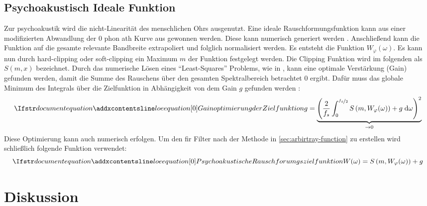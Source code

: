 \subsection{Psychoakustisch Ideale Funktion}

Zur psychoakustik wird die nicht-Linearität des menschlichen Ohrs ausgenutzt.
Eine ideale Rauschformungsfunktion kann aus einer modifizierten Abwandlung der $0$ \gls{phon} \gls{ath} Kurve aus  gewonnen werden.
Diese kann numerisch generiert werden \autocite[S. 2 ff.]{iso226}\autocite{iso226matlab}.
Anschließend kann die Funktion auf die gesamte relevante Bandbreite extrapoliert und folglich normalisiert werden.
Es entsteht die Funktion $W_\varphi(\omega)$.
Es kann nun durch \gls{hard-clipping} oder \gls{soft-clipping} ein Maximum $m$ der Funktion festgelegt werden.
Die Clipping Funktion wird im folgenden als $S(m, x)$ bezeichnet.
Durch das numerische Lösen eines \foreignquote{english}{Least-Squares} Problems, wie in \citeauthor{noise-shaping} \autocite{noise-shaping}, kann eine optimale Verstärkung (Gain) gefunden werden, damit die Summe des Rauschens über den gesamten Spektralbereich betrachtet 0 ergibt.
Dafür muss das globale Minimum des Integrals über die Zielfunktion in Abhängigkeit von dem Gain $g$ gefunden werden \autocite[S. 149]{noise-shaping}:
\begin{equation}
\setequationentry{Gainoptimierung der Zielfunktion}
g = \underbrace{\left( \frac{2}{f_s} \int_{0}^{\nicefrac{f_s}{2}} S \left(m , W_\varphi(\omega)\right) + g\; \text{d} \omega \right)^2}_{\to 0}
\label{eq:optimize}
\end{equation}
Diese Optimierung kann auch numerisch erfolgen.
Um den \gls{fir} Filter nach der Methode in \autoref{sec:arbirtray-function} zu erstellen wird schließlich folgende Funktion verwendet:
\begin{equation}
\setequationentry{Psychoakustische Rauschforumgszielfunktion}
W(\omega) = S \left( m, W_\varphi(\omega) \right) + g
\end{equation}

\section{Diskussion}

